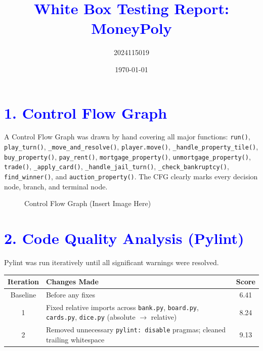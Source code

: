 \documentclass{article}
\title{\textcolor{blue}{White Box Testing Report: MoneyPoly}}
\author{2024115019}
\date{\today}
\begin{document}
\maketitle

\section*{\textcolor{blue}{1. Control Flow Graph}}
A Control Flow Graph was drawn by hand covering all major functions: \texttt{run()}, \texttt{play\_turn()}, \texttt{\_move\_and\_resolve()}, \texttt{player.move()}, \texttt{\_handle\_property\_tile()}, \texttt{buy\_property()}, \texttt{pay\_rent()}, \texttt{mortgage\_property()}, \texttt{unmortgage\_property()}, \texttt{trade()}, \texttt{\_apply\_card()}, \texttt{\_handle\_jail\_turn()}, \texttt{\_check\_bankruptcy()}, \texttt{find\_winner()}, and \texttt{auction\_property()}. The CFG clearly marks every decision node, branch, and terminal node.

\begin{figure}[h]
  \centering
  \fbox{\rule{0pt}{3in} \rule{0.9\textwidth}{0pt}} %
  \caption{Control Flow Graph (Insert Image Here)}
  \label{fig:cfg}
\end{figure}

\section*{\textcolor{blue}{2. Code Quality Analysis (Pylint)}}

Pylint was run iteratively until all significant warnings were resolved.

\begin{center}
\begin{tabular}{clc}
\toprule
Iteration & Changes Made & Score \\
\midrule
Baseline & Before any fixes & 6.41 \\
1 & Fixed relative imports across \texttt{bank.py}, \texttt{board.py}, \texttt{cards.py}, \texttt{dice.py} (absolute $\to$ relative) & 8.24 \\
2 & Removed unnecessary \texttt{pylint: disable} pragmas; cleaned trailing whitespace & 9.13 \\
\bottomrule
\end{tabular}
\end{center}
\end{document}
